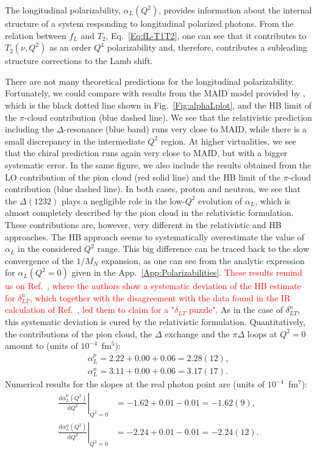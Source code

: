 \documentclass[twocolumn,prc,showpacs,nofootinbib,preprintnumbers,amsmath,amssymb,superscriptaddress]{revtex4-1}
\def\dd{\mathrm{d}}
\begin{document}
The longitudinal polarizability, $\alpha_L(Q^2)$, provides information about the internal structure of a system responding to longitudinal polarized photons.
From the relation between $f_L$ and $T_2$, Eq.~\eqref{Eq:fL-T1T2}, one can see that it contributes to $T_2(\nu,Q^2)$ as an order $Q^4$ polarizability and, therefore,  contributes a subleading structure corrections to the Lamb shift.




There are not many theoretical predictions for the longitudinal polarizability. 
Fortunately, we could compare with results from the MAID model \cite{Drechsel:2000ct,Drechsel:1998hk,Drechsel:2002ar} provided by \cite{private-Lothar}, which is the black dotted line shown in Fig.~\ref{Fig:alphaLplot}, and the HB limit of the $\pi$-cloud contribution (blue dashed line). 
We see that the relativistic prediction including the $\Delta$-resonance  (blue band) runs very close to MAID, while there is a small discrepancy in the intermediate $Q^2$ region.
At higher virtualities, we see that the chiral prediction runs again very close to MAID, but with a bigger systematic error.
In the same figure, we also include the results obtained from the LO contribution of the pion cloud (red solid line) and the HB limit of the $\pi$-cloud contribution \cite{Nevado:2007dd} (blue dashed line). 
In both cases, proton and neutron, we see that the $\Delta(1232)$ plays a negligible role in the low-$Q^2$ evolution of $\alpha_L$, which is almost completely described by the pion cloud in the relativistic formulation.
These contributions are, however, very different in the relativistic and HB approaches.
The HB approach seems to systematically overestimate the value of $\alpha_L$ in the considered $Q^2$ range. 
This big difference can be traced back to the slow convergence of the $1/M_N$ expansion, as one can see from the analytic expression for $\alpha_L(Q^2=0)$ given in the App.~\ref{App:Polarizabilities}.
\textcolor{red}{These results remind us on Ref.~\cite{Kao:2002cp}, where the authors show a systematic deviation of the HB estimate for $\delta_{LT}^{n}$, which together with the disagreement with the data found in the IR calculation of Ref.~\cite{Bernard:2002pw}, led them to claim for a "$\delta_{LT}$ puzzle". }
As in the case of $\delta_{LT}^n$, this systematic deviation is cured by the relativistic formulation.
Quantitatively, the contributions of the pion cloud, the $\Delta$ exchange and the $\pi\Delta$ loops at $Q^2=0$ amount to (units of $10^{-4}$~fm$^5$):
\begin{align}
\alpha^p_L= 2.22+ 0.00+  0.06=2.28(12), \\
\alpha^n_L= 3.11 + 0.00+ 0.06 = 3.17(17).
\end{align}
Numerical results for the slopes at the real photon point are (units of $10^{-4}$~fm$^7$):
\begin{align}
\left.\frac{\dd\alpha^p_L (Q^2)}{\dd Q^2}\right|_{Q^2=0}&=  -1.62 + 0.01 - 0.01 = -1.62(9),  \\
\left.\frac{\dd\alpha^n_L (Q^2)}{\dd Q^2}\right|_{Q^2=0}&= -2.24 + 0.01 - 0.01 = -2.24(12).
\end{align}
\end{document}
